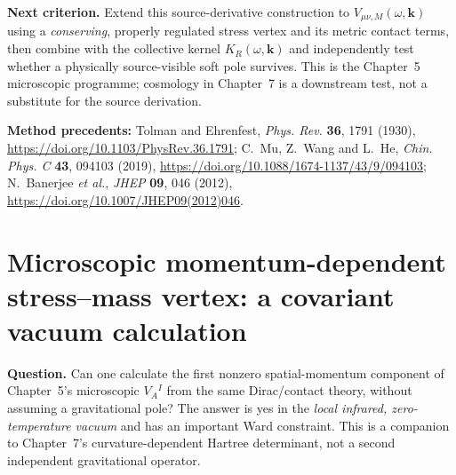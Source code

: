 \documentclass[11pt,a4paper]{article}
\theoremstyle{remark}\newtheorem{remark}[theorem]{Remark}
\begin{document}
\textbf{Next criterion.} Extend this source-derivative construction to
$V_{\mu\nu,M}(\omega,\mathbf k)$ using a \emph{conserving},
properly regulated stress vertex and its metric contact terms, then
combine with the collective kernel $K_R(\omega,\mathbf k)$ and
independently test whether a physically source-visible soft pole survives.
This is the Chapter~5 microscopic programme; cosmology in Chapter~7
is a downstream test, not a substitute for the source derivation.
\par\medskip
\noindent\textbf{Method precedents:} Tolman and Ehrenfest,
\emph{Phys. Rev.} \textbf{36}, 1791 (1930),
\url{https://doi.org/10.1103/PhysRev.36.1791};
C.~Mu, Z.~Wang and L.~He, \emph{Chin. Phys. C} \textbf{43},
094103 (2019), \url{https://doi.org/10.1088/1674-1137/43/9/094103};
N.~Banerjee \emph{et al.}, \emph{JHEP} \textbf{09}, 046 (2012),
\url{https://doi.org/10.1007/JHEP09(2012)046}.
\endgroup


\clearpage
\section{Microscopic momentum-dependent stress--mass vertex: a covariant vacuum calculation}
\label{sec:v35-wardvertex}
\textbf{Question.} Can one calculate the first nonzero spatial-momentum component of Chapter~5's microscopic $V_A{}^I$ from the same Dirac/contact theory, without assuming a gravitational pole? The answer is yes in the \emph{local infrared, zero-temperature vacuum} and has an important Ward constraint. This is a companion to Chapter~7's curvature-dependent Hartree determinant, not a second independent gravitational operator.
\end{document}
